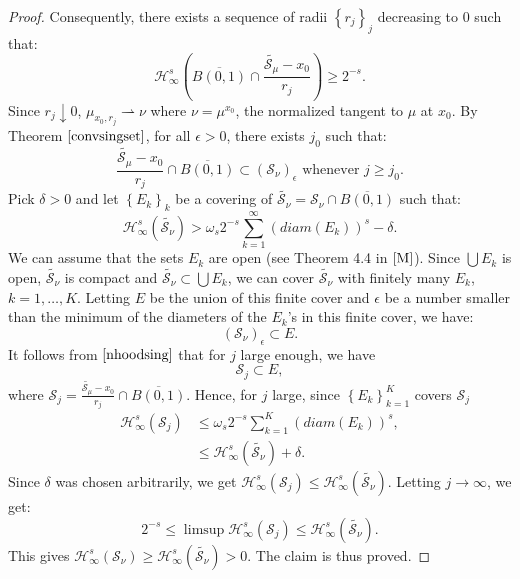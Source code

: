 \documentclass[11pt]{article}
\theoremstyle{definition}
\theoremstyle{remark}
\numberwithin{equation}{section}
\begin{document}
\begin{proof}
Consequently, there exists a sequence of  radii $\left\lbrace r_{j} \right\rbrace _{j}$ decreasing to $0$ such that:
$$\mathcal{H}_{\infty}^{s} \left(\overline{B(0,1)} \cap \frac{\tilde{{\mathcal{S}}_{\mu}} - x_0}{r_j}\right) \geq 2^{-s}. $$
Since $r_j \downarrow 0$, $\mu_{ x_0 , r_j } \rightharpoonup \nu$ where $\nu= \mu^{x_0}$, the normalized tangent to $\mu$ at $x_0$.
By Theorem $\ref{convsingset}$, for all $\epsilon >0$, there exists $j_{0}$ such that: 
\begin{equation} \label{nhoodsing}
\frac{\tilde{\mathcal{S}_{\mu}} - x_{0}}{r_j} \cap \overline{B(0,1)} \subset \left( \mathcal{S}_{\nu} \right)_{\epsilon}  \mbox{ whenever }         j \geq j_{0}.
\end{equation}
Pick $\delta > 0$ and let $\left\lbrace E_k \right\rbrace _{k}$ be a covering of $\tilde{\mathcal{S}_{\nu}} = \mathcal{S}_{\nu} \cap \overline{B(0,1)}$ such that:
$$\mathcal{H}^{s}_{\infty}(\tilde{\mathcal{S}_{\nu}} ) >  \omega_{s} 2^{-s} \sum_{k=1}^{\infty} (diam(E_k))^{s}  - \delta.$$
We can assume that the sets $E_k$ are open (see Theorem 4.4 in $\cite{M}$).
Since $\bigcup E_{k}$ is open, $\tilde{\mathcal{S}_{\nu}}$ is compact and $\tilde{\mathcal{S}_{\nu}} \subset \bigcup E_{k}$, we can cover $\tilde{\mathcal{S}_{\nu}}$ with finitely many $E_k$, $k=1,\ldots,K$. Letting $E$ be the union of this finite cover and $\epsilon$ be a number smaller than the minimum of the diameters of the  $E_k$'s in this finite cover, we have:
$$(\mathcal{S}_{\nu} )_{\epsilon} \subset E.$$
It follows from $\eqref{nhoodsing}$ that for $j$ large enough, we have
$$\mathcal{S}_{j} \subset E,$$
where $\mathcal{S}_{j} = \frac{\tilde{\mathcal{S}_{\mu}} - x_0}{r_j} \cap \overline{B(0,1)}$.
Hence, for $j$ large, since $\left\lbrace E_k \right\rbrace_{k=1}^{K}$ covers $\mathcal{S}_{j}$
\begin{align*}
\mathcal{H}^{s}_{\infty}(\mathcal{S}_{j} )  & \leq \omega_s 2^{-s} \sum_{k=1}^{K} (diam(E_k))^s, \\ &\leq  \mathcal{H}^{s}_{\infty}(\tilde{\mathcal{S}_{\nu}})+\delta.
\end{align*}
Since $\delta$ was chosen arbitrarily, we get $
\mathcal{H}^{s}_{\infty}(\mathcal{S}_{j} ) \leq \mathcal{H}_{\infty}^{s}(\tilde{\mathcal{S}_{\nu}})$.
Letting $j \to \infty$, we get:
$$2^{-s} \leq \limsup \mathcal{H}^{s}_{\infty}(\mathcal{S}_{j} ) \leq  \mathcal{H}_{\infty}^{s}(\tilde{\mathcal{S}_{\nu}}).$$
This gives $\mathcal{H}_{\infty}^{s}(\mathcal{S}_{\nu}) \geq  \mathcal{H}_{\infty}^{s}(\tilde{\mathcal{S}_{\nu}}) >0$. The claim is thus proved. 


\end{proof}
\end{document}
